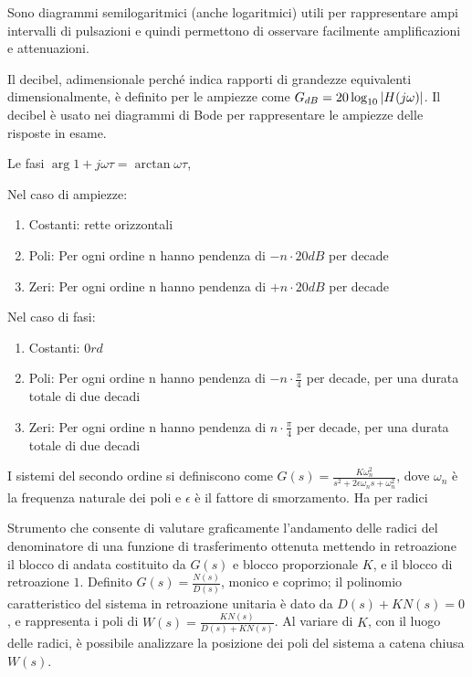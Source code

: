 Sono diagrammi semilogaritmici (anche logaritmici) utili per rappresentare ampi intervalli di pulsazioni e quindi permettono di osservare facilmente amplificazioni e attenuazioni.

Il decibel, adimensionale perché indica rapporti di grandezze equivalenti dimensionalmente, è definito per le ampiezze come $G_{dB} = 20\log_{10}{\left|H(j\omega)\right|}$. Il decibel è usato nei diagrammi di Bode per rappresentare le ampiezze delle risposte in esame.

Le fasi $\arg{1+j\omega \tau}=\arctan{\omega \tau}$, 

Nel caso di ampiezze:
\begin{enumerate}
    \item Costanti: rette orizzontali
    \item Poli: Per ogni ordine n hanno pendenza di $-n\cdot 20dB$ per decade 
    \item Zeri: Per ogni ordine n hanno pendenza di $+n\cdot 20dB$ per decade
\end{enumerate}

Nel caso di fasi:
\begin{enumerate}
    \item Costanti: $0 rd$
    \item Poli: Per ogni ordine n hanno pendenza di $-n\cdot \frac{\pi}{4}$ per decade, per una durata totale di due decadi
    \item Zeri: Per ogni ordine n hanno pendenza di $n\cdot \frac{\pi}{4}$ per decade, per una durata totale di due decadi
\end{enumerate}

I sistemi del secondo ordine si definiscono come \(G(s)=\frac{K \omega_n^2}{s^2+2\epsilon\omega_n s +\omega_n^2}\), dove \(\omega_n\) è la frequenza naturale dei poli e  \(\epsilon\) è il fattore di smorzamento. Ha per radici 


Strumento che consente di valutare graficamente l'andamento delle radici del denominatore di una funzione di trasferimento ottenuta mettendo in retroazione il blocco di andata costituito da $G(s)$ e blocco proporzionale $K$, e il blocco di retroazione $1$. 
Definito $G(s)=\frac{N(s)}{D(s)}$, monico e coprimo; il polinomio caratteristico del sistema in retroazione unitaria è dato da $D(s) + K N(s) = 0$, e rappresenta i poli di $W(s)=\frac{K N(s)}{D(s) + K N(s)}$. Al variare di $K$, con il luogo delle radici, è possibile analizzare la posizione dei poli del sistema a catena chiusa $W(s)$.

